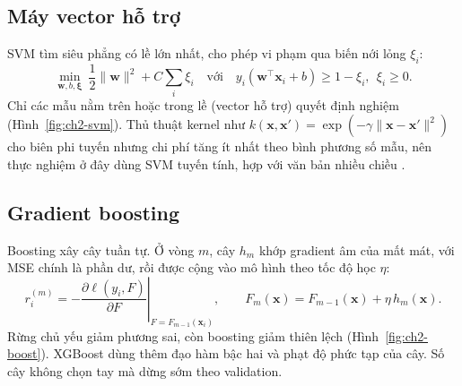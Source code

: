 
\subsection{Máy vector hỗ trợ}
SVM \cite{ch2:cortes1995} tìm siêu phẳng có lề lớn nhất, cho phép vi phạm qua biến nới lỏng $\xi_i$:
\begin{equation}
  \min_{\mathbf{w},b,\boldsymbol\xi}\ \frac12\|\mathbf{w}\|^2+C\sum_{i}\xi_i\quad\text{với}\quad y_i(\mathbf{w}^\top\mathbf{x}_i+b)\ge1-\xi_i,\ \ \xi_i\ge0.
\end{equation}
Chỉ các mẫu nằm trên hoặc trong lề (vector hỗ trợ) quyết định nghiệm (Hình~\ref{fig:ch2-svm}). Thủ thuật kernel như $k(\mathbf{x},\mathbf{x}')=\exp(-\gamma\|\mathbf{x}-\mathbf{x}'\|^2)$ cho biên phi tuyến nhưng chi phí tăng ít nhất theo bình phương số mẫu, nên thực nghiệm ở đây dùng SVM tuyến tính, hợp với văn bản nhiều chiều \cite{ch2:joachims1998}.


\subsection{Gradient boosting}
Boosting \cite{ch2:friedman2001} xây cây tuần tự. Ở vòng $m$, cây $h_m$ khớp gradient âm của mất mát, với MSE chính là phần dư, rồi được cộng vào mô hình theo tốc độ học $\eta$:
\begin{equation}
  r_i^{(m)}=-\left.\frac{\partial\ell(y_i,F)}{\partial F}\right|_{F=F_{m-1}(\mathbf{x}_i)},\qquad F_m(\mathbf{x})=F_{m-1}(\mathbf{x})+\eta\,h_m(\mathbf{x}).
\end{equation}
Rừng chủ yếu giảm phương sai, còn boosting giảm thiên lệch (Hình~\ref{fig:ch2-boost}). XGBoost \cite{ch2:chen2016} dùng thêm đạo hàm bậc hai và phạt độ phức tạp của cây. Số cây không chọn tay mà dừng sớm theo validation.


